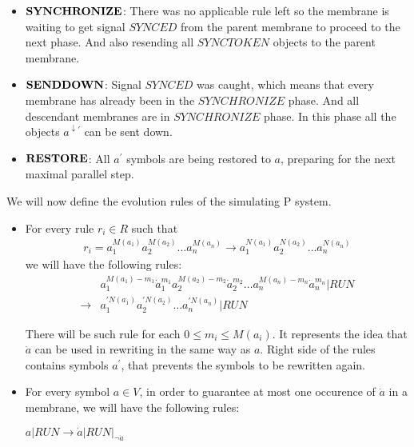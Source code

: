 \begin{dokaz}
\begin{itemize}
    \item $\mathit{\bf SYNCHRONIZE}$: There was no applicable rule left so the membrane is waiting to get signal $\mathit{SYNCED}$ from the parent membrane to proceed to the next phase. And also resending all $\mathit{SYNCTOKEN}$ objects to the parent membrane.

    \item $\mathit{\bf SENDDOWN}$: Signal $\mathit{SYNCED}$ was caught, which means that every membrane has already been in the $\mathit{SYNCHRONIZE}$ phase. And all descendant membranes are in $\mathit{SYNCHRONIZE}$ phase. In this phase all the objects $a^{\downarrow\prime}$ can be sent down.

    \item $\mathit{\bf RESTORE}$: All $a^{\prime}$ symbols are being restored to $a$, preparing for the next maximal parallel step.
  \end{itemize}


  We will now define the evolution rules of the simulating P system.

  \begin{itemize}
    \item For every rule $r_i\in R$ such that
      \begin{align*}
        r_i = a_1^{M(a_1)}a_2^{M(a_2)}\dots a_n^{M(a_n)} \rightarrow a_1^{N(a_1)}a_2^{N(a_2)}\dots a_n^{N(a_n)}
      \end{align*}
      we will have the following rules:
      \begin{align*}
        &a_1^{M(a_1)-m_1}\dot{a}_1^{m_1}
        a_2^{M(a_2)-m_2}\dot{a}_2^{m_2}\dots
        a_n^{M(a_n)-m_n}\dot{a}_n^{m_n}|\mathit{RUN} \\
        \rightarrow &a_1^{\prime N(a_1)}a_2^{\prime N(a_2)}\dots a_n^{\prime N(a_n)}|\mathit{RUN}
      \end{align*}
      
      There will be such rule for each $0\leq m_i\leq M(a_i)$. It represents the idea that $\dot{a}$ can be used in rewriting in the same way as $a$. Right side of the rules contains symbols $a^\prime$, that prevents the symbols to be rewritten again.

    \item For every symbol $a\in V$, in order to guarantee at most one occurence of $\dot{a}$ in a membrane, we will have the following rules:

    $a|\mathit{RUN} \rightarrow \dot{a}|\mathit{RUN}|_{\neg \dot{a}}$


\end{itemize}
\end{dokaz}
